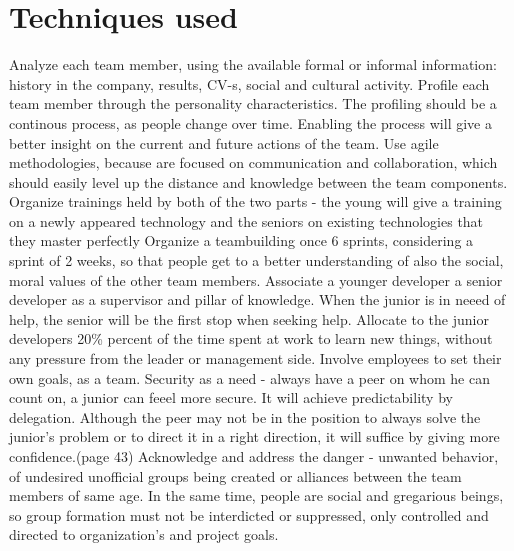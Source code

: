 \documentclass[conference]{IEEEtran}
\begin{document}
\section{Techniques used}
Analyze each team member, using the available formal or informal information: history in the company, results, CV-s, social and cultural activity. Profile each team member through the personality characteristics. The profiling should be a continous process, as people change over time. Enabling the process will give a better insight on the current and future actions of the team.
\newline\indent
Use agile methodologies, because are focused on communication and collaboration, which should easily level up the distance and knowledge between the team components.
\newline\indent
Organize trainings held by both of the two parts - the young will give a training on a newly appeared technology and the seniors on existing technologies that they master perfectly
\newline\indent
Organize a teambuilding once 6 sprints, considering a sprint of 2 weeks, so that people get to a better understanding of also the social, moral values of the other team members.
\newline\indent
Associate a younger developer a senior developer as a supervisor and pillar of knowledge. When the junior is in neeed of help, the senior will be the first stop when seeking help.
\newline\indent
Allocate to the junior developers 20\% percent of the time spent at work to learn new things, without any pressure from the leader or management side.
\newline\indent
Involve employees to set their own goals, as a team.
\newline\indent
Security as a need - always have a peer on whom he can count on, a junior can feeel more secure. It will achieve predictability by delegation. Although the peer may not be in the position to always solve the junior's problem or to direct it in a right direction, it will suffice by giving more confidence.(page 43)
\newline\indent
Acknowledge and address the danger - unwanted behavior, of undesired unofficial groups being created or alliances between the team members of same age. In the same time, people are social and gregarious beings, so group formation must not be interdicted or suppressed, only controlled and directed to organization's and project goals.
\newline\indent
\end{document}
